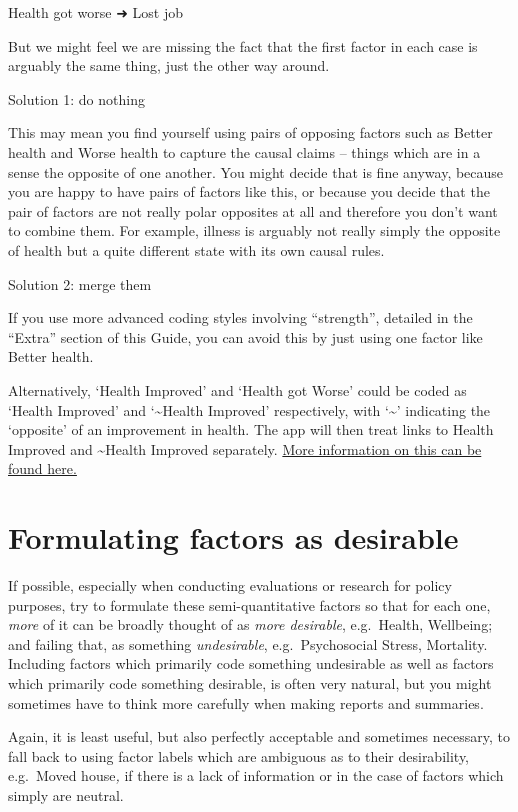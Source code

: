 \documentclass[
]{book}
\begin{document}
Health got worse ➜ Lost job

But we might feel we are missing the fact that the first factor in each case is arguably the same thing, just the other way around.

Solution 1: do nothing

This may mean you find yourself using pairs of opposing factors such as Better health and Worse health to capture the causal claims -- things which are in a sense the opposite of one another. You might decide that is fine anyway, because you are happy to have pairs of factors like this, or because you decide that the pair of factors are not really polar opposites at all and therefore you don't want to combine them. For example, illness is arguably not really simply the opposite of health but a quite different state with its own causal rules.

Solution 2: merge them

If you use more advanced coding styles involving ``strength'', detailed in the ``Extra'' section of this Guide, you can avoid this by just using one factor like Better health.

Alternatively, `Health Improved' and `Health got Worse' could be coded as `Health Improved' and `\textasciitilde Health Improved' respectively, with `\textasciitilde{}' indicating the `opposite' of an improvement in health. The app will then treat links to Health Improved and \textasciitilde Health Improved separately.
\protect\hyperlink{combining-opposites}{More information on this can be found here.}

\hypertarget{formulating-factors-as-desirable}{%
\section{Formulating factors as desirable}\label{formulating-factors-as-desirable}}

If possible, especially when conducting evaluations or research for policy purposes, try to formulate these semi-quantitative factors so that for each one, \emph{more} of it can be broadly thought of as \emph{more desirable}, e.g.~Health, Wellbeing; and failing that, as something \emph{undesirable}, e.g.~Psychosocial Stress, Mortality. Including factors which primarily code something undesirable as well as factors which primarily code something desirable, is often very natural, but you might sometimes have to think more carefully when making reports and summaries.

Again, it is least useful, but also perfectly acceptable and sometimes necessary, to fall back to using factor labels which are ambiguous as to their desirability, e.g.~Moved house\emph{,} if there is a lack of information or in the case of factors which simply are neutral.
\end{document}
